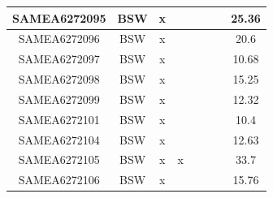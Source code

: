 \documentclass[../main.tex]{subfiles}
\begin{document}
\begin{flushleft}
\begin{footnotesize}
\begin{longtable}{|c|c|c|c|c|c|c|}
    \hline
    SAMEA6272095  & BSW   & x                                                            & ~          & ~                                                                           & ~                                                                 & 25.36     \\ 
    \hline
    SAMEA6272096  & BSW   & x                                                            & ~          & ~                                                                           & ~                                                                 & 20.6      \\ 
    \hline
    SAMEA6272097  & BSW   & x                                                            & ~          & ~                                                                           & ~                                                                 & 10.68     \\ 
    \hline
    SAMEA6272098  & BSW   & x                                                            & ~          & ~                                                                           & ~                                                                 & 15.25     \\ 
    \hline
    SAMEA6272099  & BSW   & x                                                            & ~          & ~                                                                           & ~                                                                 & 12.32     \\ 
    \hline
    SAMEA6272101  & BSW   & x                                                            & ~          & ~                                                                           & ~                                                                 & 10.4      \\ 
    \hline
    SAMEA6272104  & BSW   & x                                                            & ~          & ~                                                                           & ~                                                                 & 12.63     \\ 
    \hline
    SAMEA6272105  & BSW   & x                                                            & x          & ~                                                                           & ~                                                                 & 33.7      \\ 
    \hline
    SAMEA6272106  & BSW   & x                                                            & ~          & ~                                                                           & ~                                                                 & 15.76     \\ 

\end{longtable}
\end{footnotesize}
\end{flushleft}
\end{document}
